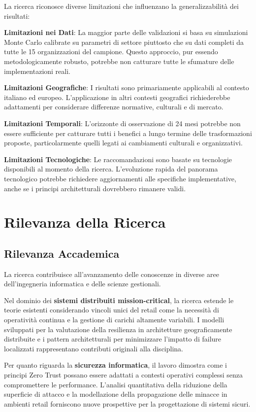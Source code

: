 La ricerca riconosce diverse limitazioni che influenzano la generalizzabilità dei risultati:

\textbf{Limitazioni nei Dati}: La maggior parte delle validazioni si basa su simulazioni Monte Carlo calibrate su parametri di settore piuttosto che su dati completi da tutte le 15 organizzazioni del campione. Questo approccio, pur essendo metodologicamente robusto, potrebbe non catturare tutte le sfumature delle implementazioni reali.

\textbf{Limitazioni Geografiche}: I risultati sono primariamente applicabili al contesto italiano ed europeo. L'applicazione in altri contesti geografici richiederebbe adattamenti per considerare differenze normative, culturali e di mercato.

\textbf{Limitazioni Temporali}: L'orizzonte di osservazione di 24 mesi potrebbe non essere sufficiente per catturare tutti i benefici a lungo termine delle trasformazioni proposte, particolarmente quelli legati ai cambiamenti culturali e organizzativi.

\textbf{Limitazioni Tecnologiche}: Le raccomandazioni sono basate su tecnologie disponibili al momento della ricerca. L'evoluzione rapida del panorama tecnologico potrebbe richiedere aggiornamenti alle specifiche implementative, anche se i principi architetturali dovrebbero rimanere validi.

\section{Rilevanza della Ricerca}

\subsection{Rilevanza Accademica}

La ricerca contribuisce all'avanzamento delle conoscenze in diverse aree dell'ingegneria informatica e delle scienze gestionali.

Nel dominio dei \textbf{sistemi distribuiti mission-critical}, la ricerca estende le teorie esistenti considerando vincoli unici del retail come la necessità di operatività continua e la gestione di carichi altamente variabili. I modelli sviluppati per la valutazione della resilienza in architetture geograficamente distribuite e i pattern architetturali per minimizzare l'impatto di failure localizzati rappresentano contributi originali alla disciplina.

Per quanto riguarda la \textbf{sicurezza informatica}, il lavoro dimostra come i principi Zero Trust possano essere adattati a contesti operativi complessi senza compromettere le performance. L'analisi quantitativa della riduzione della superficie di attacco e la modellazione della propagazione delle minacce in ambienti retail forniscono nuove prospettive per la progettazione di sistemi sicuri.

